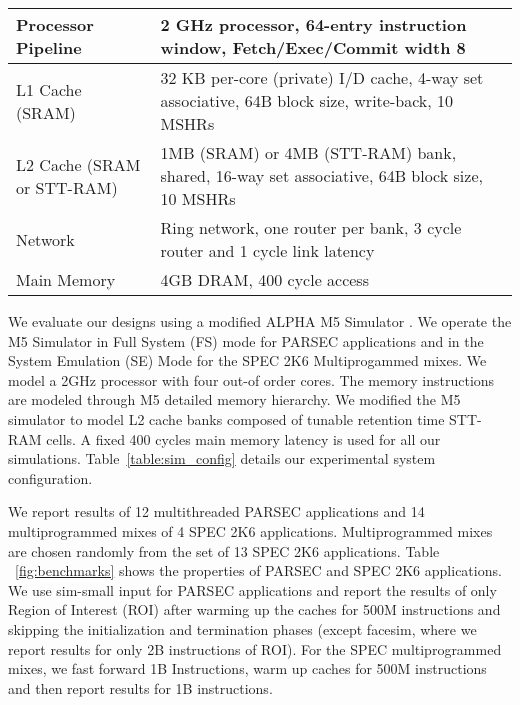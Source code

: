 \begin {table*} [t]
 \scriptsize
  \centering
 \caption {{\bf Baseline processor, cache, memory and network configuration}} \label{table:sim_config}
 \begin{tabular}{|l|l|}
 \hline
Processor Pipeline & 2 GHz processor, 64-entry instruction window, Fetch/Exec/Commit width 8 \\
\hline
L1 Cache (SRAM) & 32 KB per-core (private) I/D cache, 4-way set associative, 64B block size, write-back, 10 MSHRs \\
\hline
L2 Cache (SRAM or STT-RAM) &  1MB (SRAM) or 4MB (STT-RAM) bank, shared, 16-way set associative, 64B block size, 10 MSHRs \\
\hline
Network & Ring network, one router per bank, 3 cycle router and 1 cycle link latency \\
\hline
Main Memory & 4GB DRAM, 400 cycle access \\
\hline
\end{tabular}
\end{table*}

We evaluate our designs using a modified ALPHA M5 Simulator \cite{M5} .
We operate the M5 Simulator in Full System (FS) mode for PARSEC applications and in the System Emulation (SE) Mode
for the SPEC 2K6 Multiprogammed mixes. We model a 2GHz processor with four out-of order cores.
The memory instructions are modeled through M5 detailed memory hierarchy. We modified the M5 simulator to model
L2 cache banks composed of tunable retention time STT-RAM cells. A fixed 400 cycles main memory latency is used for all our simulations. Table~\ref{table:sim_config} details our experimental system configuration.

We report results of 12 multithreaded PARSEC applications and 14 multiprogrammed mixes of 4 SPEC 2K6 applications.
Multiprogrammed mixes are chosen randomly from the set of 13 SPEC 2K6 applications.
Table ~\ref{fig:benchmarks} shows the properties of PARSEC and SPEC 2K6 applications.
We use sim-small input for PARSEC applications and report the results of only Region of Interest (ROI)
after warming up the caches for 500M instructions and skipping the initialization and termination phases
(except facesim, where we report results for only 2B instructions of ROI). For the SPEC multiprogrammed mixes,
we fast forward 1B Instructions, warm up caches for 500M instructions and then report
results for 1B instructions.

